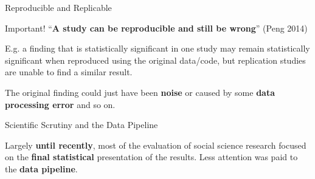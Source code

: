\documentclass[10pt]{beamer}
\begin{document}
\begin{frame}{Reproducible and Replicable}

    \begin{alertblock}{Important!}
        ``\textbf{A study can be reproducible and still be wrong}'' (Peng 2014)

        \vspace{0.5cm}

        E.g. a finding that is statistically significant in one study may remain statistically significant when reproduced using the original data/code, but replication studies are unable to find a similar result.

        \vspace{0.5cm}

        The original finding could just have been \textbf{noise} or caused by some \textbf{data processing error} and so on.
    \end{alertblock}

\end{frame}

\begin{frame}{Scientific Scrutiny and the Data Pipeline}

        Largely \textbf{until recently}, most of the evaluation of social science research focused on the \textbf{final statistical} presentation of the results. Less attention was paid to the \textbf{data pipeline}.

\end{frame}
\end{document}
